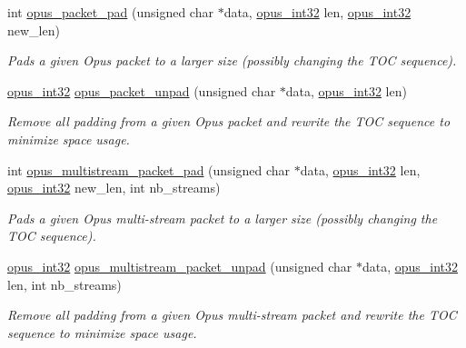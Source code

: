 \begin{DoxyCompactItemize}
int \hyperlink{group__opus__repacketizer_ga62eb1a9b887de0ce50f52eacb3609f13}{opus\+\_\+packet\+\_\+pad} (unsigned char $\ast$data, \hyperlink{opus__types_8h_aa4d309d6f80b99dbabebc8f98879ab9a}{opus\+\_\+int32} len, \hyperlink{opus__types_8h_aa4d309d6f80b99dbabebc8f98879ab9a}{opus\+\_\+int32} new\+\_\+len)
\begin{DoxyCompactList}\small\item\em Pads a given Opus packet to a larger size (possibly changing the T\+OC sequence). \end{DoxyCompactList}\item 
\hyperlink{opus__types_8h_aa4d309d6f80b99dbabebc8f98879ab9a}{opus\+\_\+int32} \hyperlink{group__opus__repacketizer_ga0f0d860cce598033814071327b626ecf}{opus\+\_\+packet\+\_\+unpad} (unsigned char $\ast$data, \hyperlink{opus__types_8h_aa4d309d6f80b99dbabebc8f98879ab9a}{opus\+\_\+int32} len)
\begin{DoxyCompactList}\small\item\em Remove all padding from a given Opus packet and rewrite the T\+OC sequence to minimize space usage. \end{DoxyCompactList}\item 
int \hyperlink{group__opus__repacketizer_gad3559b66569ca4561fe4ba8f3b1cb336}{opus\+\_\+multistream\+\_\+packet\+\_\+pad} (unsigned char $\ast$data, \hyperlink{opus__types_8h_aa4d309d6f80b99dbabebc8f98879ab9a}{opus\+\_\+int32} len, \hyperlink{opus__types_8h_aa4d309d6f80b99dbabebc8f98879ab9a}{opus\+\_\+int32} new\+\_\+len, int nb\+\_\+streams)
\begin{DoxyCompactList}\small\item\em Pads a given Opus multi-\/stream packet to a larger size (possibly changing the T\+OC sequence). \end{DoxyCompactList}\item 
\hyperlink{opus__types_8h_aa4d309d6f80b99dbabebc8f98879ab9a}{opus\+\_\+int32} \hyperlink{group__opus__repacketizer_gaa0f0e05884b48b2f901977478e74e067}{opus\+\_\+multistream\+\_\+packet\+\_\+unpad} (unsigned char $\ast$data, \hyperlink{opus__types_8h_aa4d309d6f80b99dbabebc8f98879ab9a}{opus\+\_\+int32} len, int nb\+\_\+streams)
\begin{DoxyCompactList}\small\item\em Remove all padding from a given Opus multi-\/stream packet and rewrite the T\+OC sequence to minimize space usage. \end{DoxyCompactList}\end{DoxyCompactItemize}


